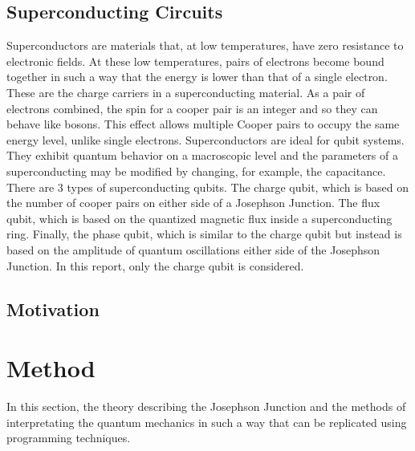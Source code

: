 \documentclass[11pt]{article}
\begin{document}
 \subsection{Superconducting Circuits}
Superconductors are materials that, at low temperatures, have zero resistance to electronic fields. At these low temperatures, pairs of electrons become bound together in such a way that the energy is lower than that of a single electron. These are the charge carriers in a superconducting material. As a pair of electrons combined, the spin for a cooper pair is an integer and so they can behave like bosons. This effect allows multiple Cooper pairs to occupy the same energy level, unlike single electrons. Superconductors are ideal for qubit systems. They exhibit quantum behavior on a macroscopic level and the parameters of a superconducting may be modified by changing, for example, the capacitance. There are 3 types of superconducting qubits. The charge qubit, which is based on the number of cooper pairs on either side of a Josephson Junction. The flux qubit, which is based on the quantized magnetic flux inside a superconducting ring. Finally, the phase qubit, which is similar to the charge qubit but instead is based on the amplitude of quantum oscillations either side of the Josephson Junction. In this report, only the charge qubit is considered.

  \subsection{Motivation}

    \section{Method}
    In this section, the theory describing the Josephson Junction and the methods of interpretating the quantum mechanics in such a way that can be replicated using programming techniques.
\end{document}
